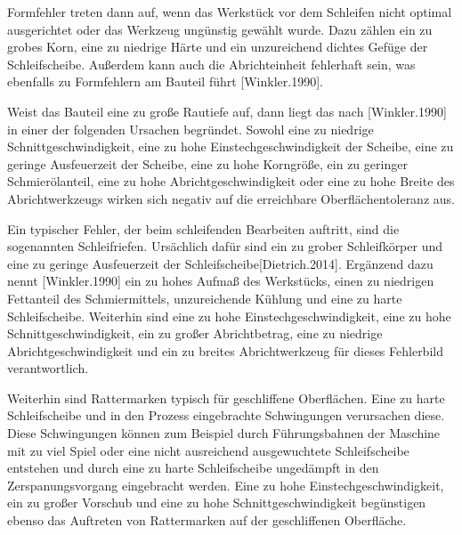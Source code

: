 Formfehler treten dann auf, wenn das Werkstück vor dem Schleifen nicht optimal ausgerichtet oder das Werkzeug ungünstig gewählt wurde. Dazu zählen ein zu grobes Korn, eine zu niedrige Härte und ein unzureichend dichtes Gefüge der Schleifscheibe. Außerdem kann auch die Abrichteinheit fehlerhaft sein, was ebenfalls zu Formfehlern am Bauteil führt [Winkler.1990]. 

Weist das Bauteil eine zu große Rautiefe auf, dann liegt das nach [Winkler.1990] in einer der folgenden Ursachen begründet. Sowohl eine zu niedrige Schnittgeschwindigkeit, eine zu hohe Einstechgeschwindigkeit der Scheibe, eine zu geringe Ausfeuerzeit der Scheibe, eine zu hohe Korngröße, ein zu geringer Schmierölanteil, eine zu hohe Abrichtgeschwindigkeit oder eine zu hohe Breite des Abrichtwerkzeugs wirken sich negativ auf die erreichbare Oberflächentoleranz aus. 

Ein typischer Fehler, der beim schleifenden Bearbeiten auftritt, sind die sogenannten Schleifriefen. Ursächlich dafür sind ein zu grober Schleifkörper und eine zu geringe Ausfeuerzeit der Schleifscheibe[Dietrich.2014].      
Ergänzend dazu nennt [Winkler.1990] ein zu hohes Aufmaß des Werkstücks, einen zu niedrigen Fettanteil des Schmiermittels, unzureichende Kühlung und eine zu harte Schleifscheibe. Weiterhin sind eine zu hohe Einstechgeschwindigkeit, eine zu hohe Schnittgeschwindigkeit, ein zu großer Abrichtbetrag, eine zu niedrige Abrichtgeschwindigkeit und ein zu breites Abrichtwerkzeug für dieses Fehlerbild verantwortlich.

Weiterhin sind Rattermarken typisch für geschliffene Oberflächen. Eine zu harte Schleifscheibe und in den Prozess eingebrachte Schwingungen verursachen diese. Diese Schwingungen können zum Beispiel durch Führungsbahnen der Maschine mit zu viel Spiel oder eine nicht ausreichend ausgewuchtete Schleifscheibe entstehen und durch eine zu harte Schleifscheibe ungedämpft in den Zerspanungsvorgang eingebracht werden. Eine zu hohe Einstechgeschwindigkeit, ein zu großer Vorschub und eine zu hohe Schnittgeschwindigkeit begünstigen ebenso das Auftreten von Rattermarken auf der geschliffenen Oberfläche.     





 

      





 

   
     



      







